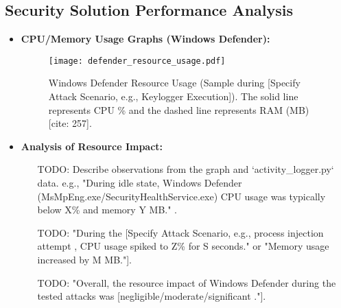 \documentclass[11pt]{article}
\begin{document}
	\subsection{Security Solution Performance Analysis}
	\begin{itemize}
		\item \textbf{CPU/Memory Usage Graphs (Windows Defender):}
		\begin{figure}[H]
			\centering
			\texttt{[image: defender\_resource\_usage.pdf]} %
			\caption{Windows Defender Resource Usage (Sample during [Specify Attack Scenario, e.g., Keylogger Execution]). The solid line represents CPU \% and the dashed line represents RAM (MB)[cite: 257].} %
			\label{fig:defender_usage}
		\end{figure}
		\item \textbf{Analysis of Resource Impact:}
		\begin{itemize}
			\item [TODO: Describe observations from the graph and `activity_logger.py` data. e.g., "During idle state, Windows Defender (MsMpEng.exe/SecurityHealthService.exe) CPU usage was typically below X\% and memory Y MB."].
			\item [TODO: "During the [Specify Attack Scenario, e.g., process injection attempt], CPU usage spiked to Z\% for S seconds." or "Memory usage increased by M MB."].
			\item [TODO: "Overall, the resource impact of Windows Defender during the tested attacks was [negligible/moderate/significant]."].
		\end{itemize}
	\end{itemize}
	
\end{document}
